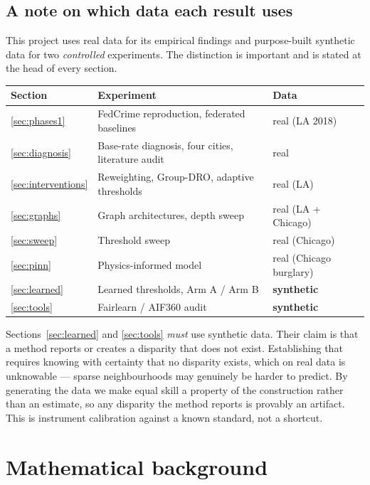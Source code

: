 \documentclass[11pt,a4paper]{article}
\begin{document}
\subsection{A note on which data each result uses}
This project uses real data for its empirical findings and purpose-built
synthetic data for two \emph{controlled} experiments. The distinction is
important and is stated at the head of every section.

\begin{center}
\begin{tabular}{lll}
\toprule
\textbf{Section} & \textbf{Experiment} & \textbf{Data} \\
\midrule
\ref{sec:phases1} & FedCrime reproduction, federated baselines & real (LA 2018) \\
\ref{sec:diagnosis} & Base-rate diagnosis, four cities, literature audit & real \\
\ref{sec:interventions} & Reweighting, Group-DRO, adaptive thresholds & real (LA) \\
\ref{sec:graphs} & Graph architectures, depth sweep & real (LA + Chicago) \\
\ref{sec:sweep} & Threshold sweep & real (Chicago) \\
\ref{sec:pinn} & Physics-informed model & real (Chicago burglary) \\
\ref{sec:learned} & Learned thresholds, Arm A / Arm B & \textbf{synthetic} \\
\ref{sec:tools} & Fairlearn / AIF360 audit & \textbf{synthetic} \\
\bottomrule
\end{tabular}
\end{center}

\noindent
Sections~\ref{sec:learned} and \ref{sec:tools} \emph{must} use synthetic data.
Their claim is that a method reports or creates a disparity that does not exist.
Establishing that requires knowing with certainty that no disparity exists,
which on real data is unknowable --- sparse neighbourhoods may genuinely be
harder to predict. By generating the data we make equal skill a property of the
construction rather than an estimate, so any disparity the method reports is
provably an artifact. This is instrument calibration against a known standard,
not a shortcut.

\section{Mathematical background}\label{sec:theory}
\end{document}
